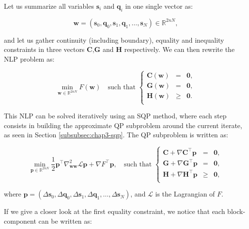 Let us summarize all variables $\mathbf{s}_i$ and $\mathbf{q}_i$ in
one single vector as:

\begin{equation}
\mathbf{w}=(\mathbf{s}_0,\mathbf{q}_0,\mathbf{s}_1,\mathbf{q}_1,\ldots,\mathbf{s}_N)
\in \mathbb R^{2nN},
\end{equation} 

and let us gather continuity (including boundary), equality and
inequality constraints in three vectors $\mathbf{C}$,$\mathbf{G}$ and
$\mathbf{H}$ respectively. We can then rewrite the NLP problem as:

\begin{equation}
  \min_{\mathbf{w}\in\mathbb R^{2nN}}F(\mathbf{w}) \quad\text{such that }
  \left\{
    \begin{array}{rcl}
      \mathbf{C}(\mathbf{w}) &=& \mathbf{0},\\
      \mathbf{G}(\mathbf{w}) &=& \mathbf{0},\\
      \mathbf{H}(\mathbf{w}) &\ge& \mathbf{0}.\\
    \end{array}
    \right.
\end{equation}

This NLP can be solved iteratively using an SQP method, where each
step consists in building the approximate QP subproblem around the
current iterate, as seen in Section \ref{subsubsec:chap3-sqp}. The QP
subproblem is written as:

\begin{equation}
  \min_{\mathbf{p}\in\mathbb R^{2nN}}
  \frac{1}{2}\mathbf{p}^\top\nabla^2_{\mathbf{w}\mathbf{w}}\mathcal{L}\mathbf{p} + \nabla
  F^\top\mathbf{p},
  \quad \text{such that }
  \left\{\begin{array}{rcl}
  \mathbf{C} + \nabla \mathbf{C}^\top\mathbf{p} &=& \mathbf{0},\\
  \mathbf{G} + \nabla \mathbf{G}^\top\mathbf{p} &=& \mathbf{0},\\
  \mathbf{H} + \nabla \mathbf{H}^\top\mathbf{p} &\ge& \mathbf{0},\\
  \end{array}\right.
\end{equation}

where $\mathbf{p}=
(\Delta\mathbf{s}_0,\Delta\mathbf{q}_0,\Delta\mathbf{s}_1,\Delta\mathbf{q}_1,\ldots,\Delta\mathbf{s}_N)$,
and $\mathcal{L}$ is the Lagrangian of $F$.

If we give a closer look at the first equality constraint, we notice
that each block-component can be written as:

